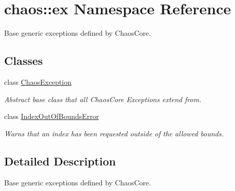 \hypertarget{namespacechaos_1_1ex}{\section{chaos\-:\-:ex Namespace Reference}
\label{namespacechaos_1_1ex}
}


Base generic exceptions defined by Chaos\-Core.  


\subsection*{Classes}
\begin{DoxyCompactItemize}
\item 
class \hyperlink{classchaos_1_1ex_1_1_chaos_exception}{Chaos\-Exception}
\begin{DoxyCompactList}\small\item\em Abstract base class that all Chaos\-Core Exceptions extend from. \end{DoxyCompactList}\item 
class \hyperlink{classchaos_1_1ex_1_1_index_out_of_bounds_error}{Index\-Out\-Of\-Bounds\-Error}
\begin{DoxyCompactList}\small\item\em Warns that an index has been requested outside of the allowed bounds. \end{DoxyCompactList}\end{DoxyCompactItemize}


\subsection{Detailed Description}
Base generic exceptions defined by Chaos\-Core. 